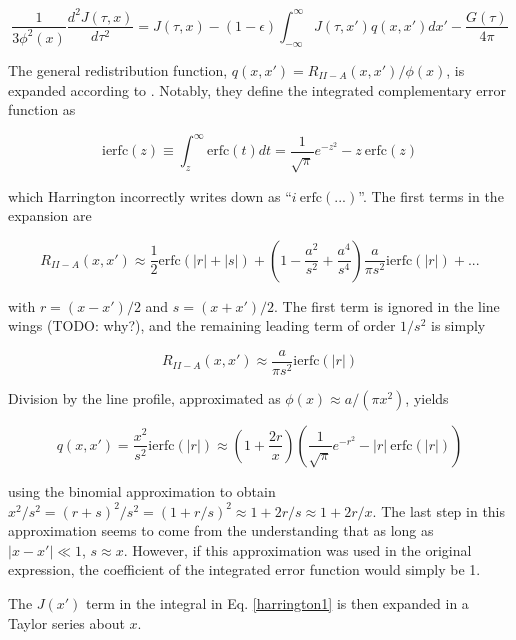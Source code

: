 \documentclass[onecolumn]{aastex63}
\begin{document}
\begin{equation} \label{harrington1}
    \frac{1}{3\phi^2(x)}\frac{d^2J(\tau, x)}{d\tau^2} = J(\tau, x) - (1-\epsilon)\int_{-\infty}^{\infty}J(\tau, x')q(x, x')dx' - \frac{G(\tau)}{4\pi}
\end{equation}

The general redistribution function, $q(x, x') = R_{II-A}(x, x')/\phi (x)$, is expanded according to \cite{1971JQSRT..11.1365A}. Notably, they define the integrated complementary error function as 

\begin{equation}
    \mathrm{ierfc}(z) \equiv \int_z^{\infty} \mathrm{erfc}(t) dt = \frac{1}{\sqrt{\pi}} e^{-z^2} - z\  \mathrm{erfc}(z)
\end{equation}

which Harrington incorrectly writes down as ``$i\ \mathrm{erfc(...)}$''. The first terms in the expansion are 


\begin{equation}
    R_{II-A}(x, x') \approx \frac{1}{2}\mathrm{erfc}(|r|+|s|) + \left(1 - \frac{a^2}{s^2} + \frac{a^4}{s^4}\right) \frac{a}{\pi s^2} \mathrm{ierfc}(|r|) + ...
\end{equation}

with $r=(x-x')/2$ and $s=(x+x')/2$. The first term is ignored in the line wings (TODO: why?), and the remaining leading term of order $1/s^2$ is simply

\begin{equation}
    R_{II-A}(x, x') \approx \frac{a}{\pi s^2}\mathrm{ierfc}(|r|)
\end{equation}

Division by the line profile, approximated as $\phi(x) \approx a/(\pi x^2)$, yields

\begin{equation}
    q(x, x') = \frac{x^2}{s^2} \mathrm{ierfc}(|r|) \approx \left(1+\frac{2r}{x}\right)\left(\frac{1}{\sqrt{\pi}}e^{-r^2} - |r|\ \mathrm{erfc}(|r|)\right)
\end{equation}

using the binomial approximation to obtain $x^2/s^2 = (r+s)^2/s^2 = (1+r/s)^2 \approx 1 + 2r/s \approx 1 + 2r/x$. The last step in this approximation seems to come from the understanding that as long as $|x-x'|\ll 1$, $s \approx x$. However, if this approximation was used in the original expression, the coefficient of the integrated error function would simply be 1.

The $J(x')$ term in the integral in Eq. \ref{harrington1} is then expanded in a Taylor series about $x$.
\end{document}
